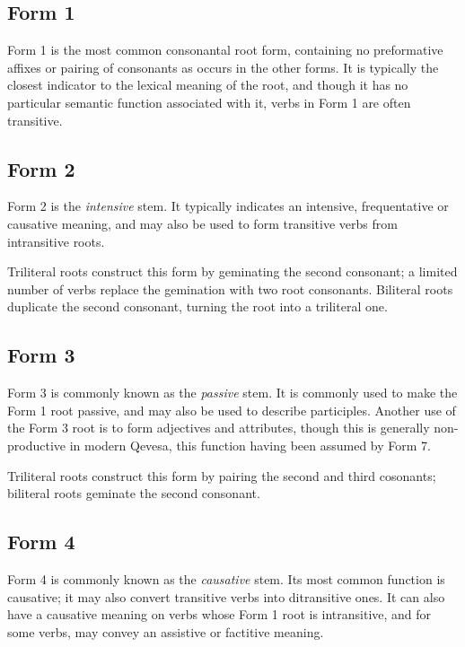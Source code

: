 \documentclass[grammar]{subfiles}
\begin{document}
  \subsection{Form 1}
  \label{ssec:dev_verb_form_1}

  Form 1 is the most common consonantal root form, containing no preformative affixes or pairing of consonants as occurs in the other forms. It is typically the closest indicator to the lexical meaning of the root, and though it has no particular semantic function associated with it, verbs in Form 1 are often transitive.

  \subsection{Form 2}
  \label{ssec:dev_verb_form_2}

  Form 2 is the \emph{intensive} stem. It typically indicates an intensive, frequentative or causative meaning, and may also be used to form transitive verbs from intransitive roots. 

  Triliteral roots construct this form by geminating the second consonant; a limited number of verbs replace the gemination with two root consonants. %
  Biliteral roots duplicate the second consonant, turning the root into a triliteral one.

  \subsection{Form 3}
  \label{ssec:dev_verb_form_3}

  Form 3 is commonly known as the \emph{passive} stem.
  It is commonly used to make the Form 1 root passive, and may also be used to describe participles.
  Another use of the Form 3 root is to form adjectives and attributes, though this is generally non-productive in modern Qevesa, this function having been assumed by Form 7.

  Triliteral roots construct this form by pairing the second and third cosonants; biliteral roots geminate the second consonant.

  \subsection{Form 4}
  \label{ssec:dev_verb_form_4}

  Form 4 is commonly known as the \emph{causative} stem. 
  Its most common function is causative; it may also convert transitive verbs into ditransitive ones.
  It can also have a causative meaning on verbs whose Form 1 root is intransitive, and for some verbs, may convey an assistive or factitive meaning.
\end{document}
